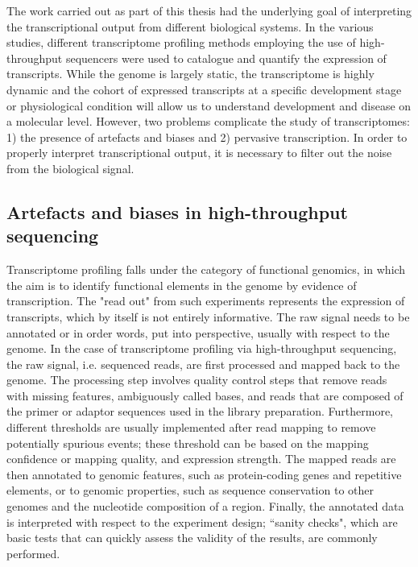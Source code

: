 The work carried out as part of this thesis had the underlying goal of interpreting the transcriptional output from different biological systems. In the various studies, different transcriptome profiling methods employing the use of high-throughput sequencers were used to catalogue and quantify the expression of transcripts. While the genome is largely static, the transcriptome is highly dynamic and the cohort of expressed transcripts at a specific development stage or physiological condition will allow us to understand development and disease on a molecular level. However, two problems complicate the study of transcriptomes: 1) the presence of artefacts and biases and 2) pervasive transcription. In order to properly interpret transcriptional output, it is necessary to filter out the noise from the biological signal.

\subsection{Artefacts and biases in high-throughput sequencing}

Transcriptome profiling falls under the category of functional genomics, in which the aim is to identify functional elements in the genome by evidence of transcription. The "read out" from such experiments represents the expression of transcripts, which by itself is not entirely informative. The raw signal needs to be annotated or in order words, put into perspective, usually with respect to the genome. In the case of transcriptome profiling via high-throughput sequencing, the raw signal, i.e. sequenced reads, are first processed and mapped back to the genome. The processing step involves quality control steps that remove reads with missing features, ambiguously called bases, and reads that are composed of the primer or adaptor sequences used in the library preparation. Furthermore, different thresholds are usually implemented after read mapping to remove potentially spurious events; these threshold can be based on the mapping confidence or mapping quality, and expression strength. The mapped reads are then annotated to genomic features, such as protein-coding genes and repetitive elements, or to genomic properties, such as sequence conservation to other genomes and the nucleotide composition of a region. Finally, the annotated data is interpreted with respect to the experiment design; ``sanity checks", which are basic tests that can quickly assess the validity of the results, are commonly performed.

